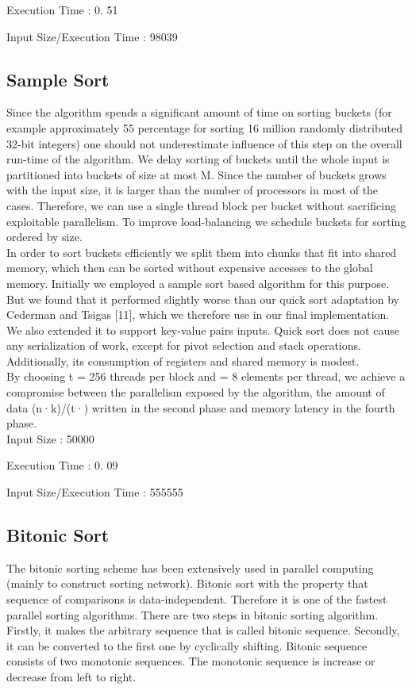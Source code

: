 \documentclass[conference]{IEEEtran}
\begin{document}
Execution Time : 0. 51

Input Size/Execution Time : 98039\\

\subsection{Sample Sort}
Since the algorithm spends a significant
amount of time on sorting buckets (for example approximately
55 percentage for sorting 16 million randomly distributed
32-bit integers) one should not underestimate influence of
this step on the overall run-time of the algorithm. We delay
sorting of buckets until the whole input is partitioned into
buckets of size at most M. Since the number of buckets
grows with the input size, it is larger than the number of
processors in most of the cases. Therefore, we can use a
single thread block per bucket without sacrificing exploitable
parallelism. To improve load-balancing we schedule buckets
for sorting ordered by size.\\

In order to sort buckets efficiently we split them into
chunks that fit into shared memory, which then can be
sorted without expensive accesses to the global memory.
Initially we employed a sample sort based algorithm for
this purpose. But we found that it performed slightly worse
than our quick sort adaptation by Cederman and Tsigas [11],
which we therefore use in our final implementation. We
also extended it to support key-value pairs inputs. Quick sort
does not cause any serialization of work, except for pivot
selection and stack operations. Additionally, its consumption
of registers and shared memory is modest. \\

 By choosing t = 256 threads per block and = 8
elements per thread, we achieve a compromise between the
parallelism exposed by the algorithm, the amount of data
(n·k)/(t·) written in the second phase and memory latency
in the fourth phase.\\

Input Size : 50000

Execution Time : 0. 09

Input Size/Execution Time : 555555

\subsection{Bitonic Sort}
The bitonic sorting scheme has been extensively used in
parallel computing (mainly to construct sorting network).
Bitonic sort with the property that sequence of comparisons is
data-independent. Therefore it is one of the fastest parallel
sorting algorithms. There are two steps in bitonic sorting
algorithm. Firstly, it makes the arbitrary sequence that is
called bitonic sequence. Secondly, it can be converted to the
first one by cyclically shifting. Bitonic sequence consists
of two monotonic sequences. The monotonic sequence is
increase or decrease from left to right.\\
\end{document}
